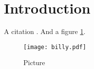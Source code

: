 \documentclass[../main.tex]{article}
\begin{document}
\section{Introduction}

A citation \citep{CavenderBares2027}. And a figure \ref{fig:billy}.

\begin{figure}[ht!]
\texttt{[image: billy.pdf]}
\centering	
\caption{Picture}
\label{fig:billy}
\end{figure}
\end{document}
